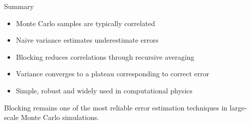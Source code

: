 \documentclass{beamer}
\begin{document}
\begin{frame}{Summary}

  \begin{itemize}

  \item Monte Carlo samples are typically correlated
  \item Naive variance estimates underestimate errors
  \item Blocking reduces correlations through recursive averaging
  \item Variance converges to a plateau corresponding to correct error
  \item Simple, robust and widely used in computational physics

  \end{itemize}

  Blocking remains one of the most reliable error estimation techniques in large-scale Monte Carlo simulations.
\end{frame}

\end{document}
